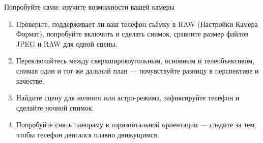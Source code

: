 \begin{tcbpractice}{Попробуйте сами: изучите возможности вашей камеры}
\begin{enumerate}
  \item Проверьте, поддерживает ли ваш телефон съёмку в RAW (Настройки Камера Формат), попробуйте включить и сделать снимок, сравните размер файлов JPEG и RAW для одной сцены.
  \item Переключайтесь между сверхширокоугольным, основным и телеобъективом, снимая один и тот же дальний план — почувствуйте разницу в перспективе и качестве.
  \item Найдите сцену для ночного или астро-режима, зафиксируйте телефон и сделайте ночной снимок.
  \item Попробуйте снять панораму в горизонтальной ориентации — следите за тем, чтобы телефон двигался плавно движущимся.
\end{enumerate}

\end{tcbpractice}

